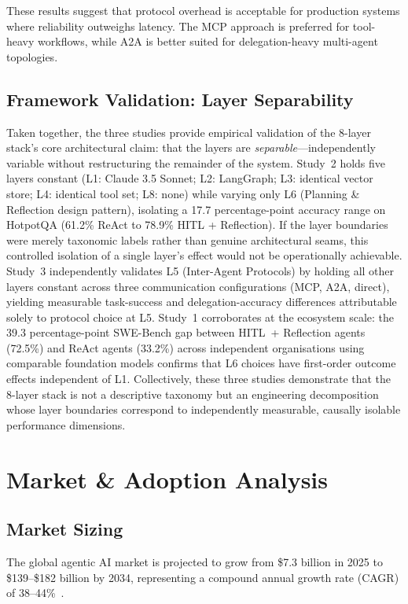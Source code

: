 \documentclass[12pt, a4paper]{article}
\begin{document}
These results suggest that protocol overhead is acceptable for production systems where reliability outweighs latency. The MCP approach is preferred for tool-heavy workflows, while A2A is better suited for delegation-heavy multi-agent topologies.

\subsection{Framework Validation: Layer Separability}\label{sec:validation}

Taken together, the three studies provide empirical validation of the 8-layer stack's core architectural claim: that the layers are \emph{separable}---independently variable without restructuring the remainder of the system. Study~2 holds five layers constant (L1: Claude 3.5 Sonnet; L2: LangGraph; L3: identical vector store; L4: identical tool set; L8: none) while varying only L6 (Planning \& Reflection design pattern), isolating a 17.7 percentage-point accuracy range on HotpotQA (61.2\% ReAct to 78.9\% HITL + Reflection). If the layer boundaries were merely taxonomic labels rather than genuine architectural seams, this controlled isolation of a single layer's effect would not be operationally achievable. Study~3 independently validates L5 (Inter-Agent Protocols) by holding all other layers constant across three communication configurations (MCP, A2A, direct), yielding measurable task-success and delegation-accuracy differences attributable solely to protocol choice at L5. Study~1 corroborates at the ecosystem scale: the 39.3 percentage-point SWE-Bench gap between HITL~+ Reflection agents (72.5\%) and ReAct agents (33.2\%) across independent organisations using comparable foundation models confirms that L6 choices have first-order outcome effects independent of L1. Collectively, these three studies demonstrate that the 8-layer stack is not a descriptive taxonomy but an engineering decomposition whose layer boundaries correspond to independently measurable, causally isolable performance dimensions.

\section{Market \& Adoption Analysis}\label{sec:market}

\subsection{Market Sizing}
The global agentic AI market is projected to grow from \$7.3 billion in 2025 to \$139--\$182 billion by 2034, representing a compound annual growth rate (CAGR) of 38--44\%~\citep{grandview2025agentic}.
\end{document}

